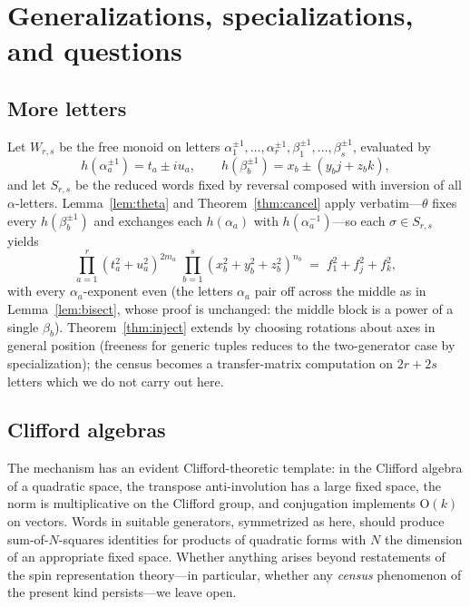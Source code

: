 \documentclass[11pt]{article}
\theoremstyle{definition}
\theoremstyle{remark}
\begin{document}
\section{Generalizations, specializations, and questions}\label{sec:general}

\subsection{More letters}
Let $W_{r,s}$ be the free monoid on letters $\alpha_1^{\pm1},\dots,\alpha_r^{\pm1},\beta_1^{\pm1},\dots,\beta_s^{\pm1}$, evaluated by
\[
h(\alpha_a^{\pm1})=t_a\pm iu_a,\qquad h(\beta_b^{\pm1})=x_b\pm(y_bj+z_bk),
\]
and let $S_{r,s}$ be the reduced words fixed by reversal composed with inversion of all $\alpha$-letters. Lemma~\ref{lem:theta} and Theorem~\ref{thm:cancel} apply verbatim---$\theta$ fixes every $h(\beta_b^{\pm1})$ and exchanges each $h(\alpha_a)$ with $h(\alpha_a^{-1})$---so each $\sigma\in S_{r,s}$ yields
\[
\prod_{a=1}^{r}(t_a^2+u_a^2)^{2m_a}\;\prod_{b=1}^{s}(x_b^2+y_b^2+z_b^2)^{n_b}\;=\;f_1^2+f_j^2+f_k^2,
\]
with every $\alpha_a$-exponent even (the letters $\alpha_a$ pair off across the middle as in Lemma~\ref{lem:bisect}, whose proof is unchanged: the middle block is a power of a single $\beta_b$). Theorem~\ref{thm:inject} extends by choosing rotations about axes in general position (freeness for generic tuples reduces to the two-generator case by specialization); the census becomes a transfer-matrix computation on $2r+2s$ letters which we do not carry out here.

\subsection{Clifford algebras}
The mechanism has an evident Clifford-theoretic template: in the Clifford algebra of a quadratic space, the transpose anti-involution has a large fixed space, the norm is multiplicative on the Clifford group, and conjugation implements $\mathrm{O}(k)$ on vectors. Words in suitable generators, symmetrized as here, should produce sum-of-$N$-squares identities for products of quadratic forms with $N$ the dimension of an appropriate fixed space. Whether anything arises beyond restatements of the spin representation theory---in particular, whether any \emph{census} phenomenon of the present kind persists---we leave open.
\end{document}
